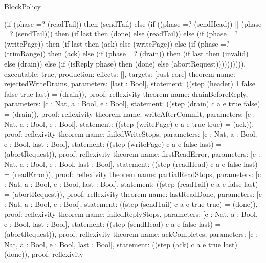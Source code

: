 \begin{lexlean}{BlockPolicy}
\begin{semanticmodule}
{      (if (phase =? (readTail)) then (sendTail) else
       (if ((phase =? (sendHead)) || (phase =? (sendTail))) then (if last then (done) else (readTail)) else
        (if (phase =? (writePage)) then (if last then (ack) else (writePage)) else
         (if (phase =? (trimRange)) then (ack) else
          (if (phase =? (drain)) then (if last then (invalid) else (drain)) else
           (if (isReply phase) then (done) else (abortRequest)))))))))),
  executable: true, production: {effects: [], targets: [rust-core]}
}
theorem{ name: rejectedWriteDrains, parameters: [last : Bool], statement: ((step (header) 1 false false true last) = (drain)), proof: reflexivity{} }
theorem{ name: drainBeforeReply, parameters: [c : Nat, a : Bool, e : Bool], statement: ((step (drain) c a e true false) = (drain)), proof: reflexivity{} }
theorem{ name: writeAfterCommit, parameters: [c : Nat, a : Bool, e : Bool], statement: ((step (writePage) c a e true true) = (ack)), proof: reflexivity{} }
theorem{ name: failedWriteStops, parameters: [c : Nat, a : Bool, e : Bool, last : Bool], statement: ((step (writePage) c a e false last) = (abortRequest)), proof: reflexivity{} }
theorem{ name: firstReadError, parameters: [c : Nat, a : Bool, e : Bool, last : Bool], statement: ((step (readHead) c a e false last) = (readError)), proof: reflexivity{} }
theorem{ name: partialReadStops, parameters: [c : Nat, a : Bool, e : Bool, last : Bool], statement: ((step (readTail) c a e false last) = (abortRequest)), proof: reflexivity{} }
theorem{ name: lastReadDone, parameters: [c : Nat, a : Bool, e : Bool], statement: ((step (sendTail) c a e true true) = (done)), proof: reflexivity{} }
theorem{ name: failedReplyStops, parameters: [c : Nat, a : Bool, e : Bool, last : Bool], statement: ((step (sendHead) c a e false last) = (abortRequest)), proof: reflexivity{} }
theorem{ name: ackCompletes, parameters: [c : Nat, a : Bool, e : Bool, last : Bool], statement: ((step (ack) c a e true last) = (done)), proof: reflexivity{} }
\end{semanticmodule}
\end{lexlean}
